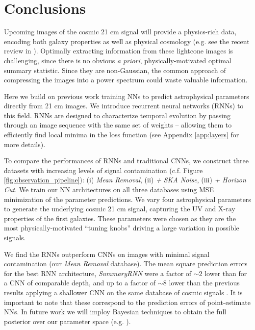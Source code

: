 \documentclass[fleqn,usenatbib]{mnras}
\begin{document}
\section{Conclusions} \label{ch:discussion_and_conclusions}

Upcoming images of the cosmic 21 cm signal will provide a physics-rich data, encoding both galaxy properties as well as physical cosmology (e.g. see the recent review in \citealt{Mesinger2019}).  Optimally extracting information from these lightcone images is challenging, since there is no obvious \textit{a priori}, physically-motivated optimal summary statistic.  Since they are non-Gaussian, the common approach of compressing the images into a power spectrum could waste valuable information.

Here we build on previous work  \citep{gillet19, 21cm_ML_Magena20, 21cm_ML_Kwon20, 21cm_ML_LaPlante19, HMV20} training NNs to predict astrophysical parameters directly from 21 cm images.  We introduce recurrent neural networks (RNNs) to this field.  RNNs are designed to characterize temporal evolution by passing through an image sequence with the same set of weights -- allowing them to efficiently find local minima in the loss function (see Appendix \ref{app:layers} for more details). 

To compare the performances of RNNs and traditional CNNs, we construct three datasets with increasing levels of signal contamination (c.f. Figure \ref{fig:observation_pipeline}): (i) {\it Mean Removal}, (ii) {\it + SKA Noise}, (iii) {\it + Horizon Cut}. We train our NN architectures on all three databases using MSE minimization of the parameter predictions.  We vary four astrophysical parameters to generate the underlying cosmic 21 cm signal, capturing the UV and X-ray properties of the first galaxies.  These parameters were chosen as they are the most physically-motivated \enquote{tuning knobs} driving a large variation in possible signals.

We find the RNNs outperform CNNs on images with minimal signal contamination (our {\it Mean Removal} database).  The mean square prediction errors for the best RNN architecture, {\it SummaryRNN} were a factor of $\sim 2$ lower than for a CNN of comparable depth, and up to a factor of $\sim 8$ lower than the previous results applying a shallower CNN on the same database of cosmic signals \citep{gillet19}. It is important to note that these correspond to the prediction errors of point-estimate NNs. In future work we will imploy Bayesian techniques to obtain the full posterior over our parameter space (e.g. \citealt{21cm_ML_Hortua20, zhao2021}).
\end{document}
